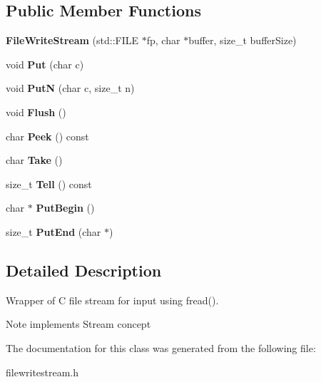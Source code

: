 \subsection*{Public Member Functions}
\begin{DoxyCompactItemize}
\item 
\mbox{\label{a02196_a553ea3e7377a7f7cace2daa3cc90e1a1}} 
{\bfseries File\+Write\+Stream} (std\+::\+F\+I\+LE $\ast$fp, char $\ast$buffer, size\+\_\+t buffer\+Size)
\item 
\mbox{\label{a02196_af6a6061d0accd939fa475b9b34427d85}} 
void {\bfseries Put} (char c)
\item 
\mbox{\label{a02196_ad9ec108b24316a2c1c83c6ddc75d308a}} 
void {\bfseries PutN} (char c, size\+\_\+t n)
\item 
\mbox{\label{a02196_a939fbf183ba36464c5e0837df4329d37}} 
void {\bfseries Flush} ()
\item 
\mbox{\label{a02196_ab556c7e26346ddff0e579a53c09c3a13}} 
char {\bfseries Peek} () const
\item 
\mbox{\label{a02196_ac927a0ae09a85eaba58a74ceb04b40ed}} 
char {\bfseries Take} ()
\item 
\mbox{\label{a02196_a06272de32d6ac4d10c9bd5deb79a0234}} 
size\+\_\+t {\bfseries Tell} () const
\item 
\mbox{\label{a02196_a4d1340a64fde3f16ac2afce19537c75e}} 
char $\ast$ {\bfseries Put\+Begin} ()
\item 
\mbox{\label{a02196_a54b14047e4c998db0594290605f8f0dc}} 
size\+\_\+t {\bfseries Put\+End} (char $\ast$)
\end{DoxyCompactItemize}


\subsection{Detailed Description}
Wrapper of C file stream for input using fread(). 

\begin{DoxyNote}{Note}
implements Stream concept 
\end{DoxyNote}


The documentation for this class was generated from the following file\+:\begin{DoxyCompactItemize}
\item 
filewritestream.\+h\end{DoxyCompactItemize}
